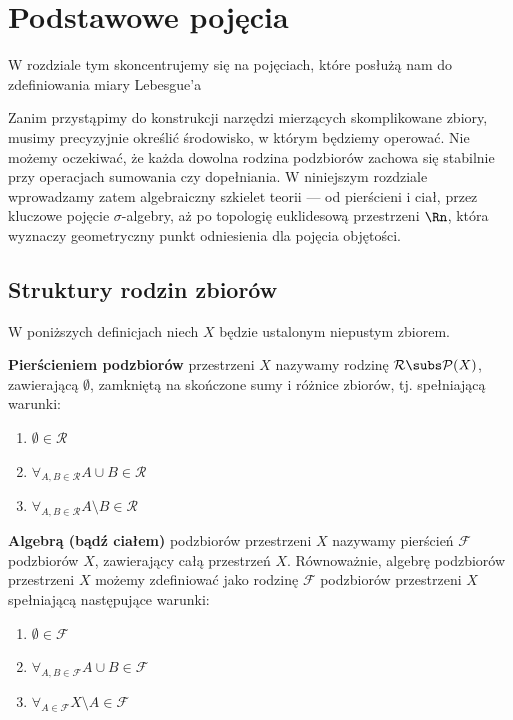 \section{Podstawowe pojęcia}
W rozdziale tym skoncentrujemy się na pojęciach, które posłużą nam do zdefiniowania miary Lebesgue'a

Zanim przystąpimy do konstrukcji narzędzi mierzących skomplikowane zbiory, musimy precyzyjnie określić środowisko, w którym będziemy operować. Nie możemy oczekiwać, że każda dowolna rodzina podzbiorów zachowa się stabilnie przy operacjach sumowania czy dopełniania. W niniejszym rozdziale wprowadzamy zatem algebraiczny szkielet teorii — od pierścieni i ciał, przez kluczowe pojęcie $\sigma$-algebry, aż po topologię euklidesową przestrzeni $\Rn$, która wyznaczy geometryczny punkt odniesienia dla pojęcia objętości.

\subsection{Struktury rodzin zbiorów}
W poniższych definicjach niech $X$ będzie ustalonym niepustym zbiorem.
\begin{defi}
    \textbf{Pierścieniem podzbiorów} przestrzeni $X$ nazywamy rodzinę $\mathcal{R} \subs \mathcal{P}(X)$, zawierającą $\emptyset$, zamkniętą na skończone sumy i różnice zbiorów, tj. spełniającą warunki:
    \begin{enumerate}
        \item $\emptyset \in \mathcal{R}$
        \item $\forall_{A, B \in \mathcal{R}} A \cup B \in \mathcal{R}$
        \item $\forall_{A, B \in \mathcal{R}} A \setminus B \in \mathcal{R}$
    \end{enumerate}
\end{defi}

\begin{defi}
    \textbf{Algebrą (bądź ciałem)} podzbiorów przestrzeni $X$  nazywamy pierścień $\mathcal{F}$ podzbiorów $X$, zawierający całą przestrzeń $X$. Równoważnie, algebrę podzbiorów przestrzeni $X$ możemy zdefiniować jako rodzinę $\mathcal{F}$ podzbiorów przestrzeni $X$ spełniającą następujące warunki:
    \begin{enumerate}
        \item $\emptyset \in \mathcal{F}$
        \item $\forall_{A,B \in \mathcal{F}} A \cup B \in \mathcal{F}$
        \item $\forall_{A \in \mathcal{F}} X \setminus A \in \mathcal{F}$
    \end{enumerate}
\end{defi}

